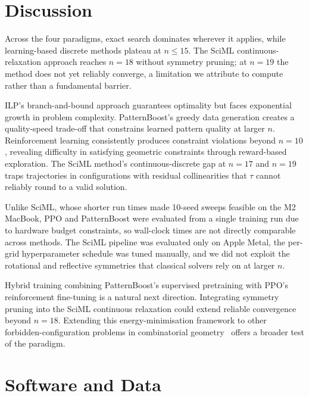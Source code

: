 \documentclass{article}
\theoremstyle{plain}
\theoremstyle{definition}
\theoremstyle{remark}
\begin{document}

\section{Discussion}

Across the four paradigms, exact search dominates wherever it applies, while learning-based discrete methods plateau at $n \le 15$. The SciML continuous-relaxation approach reaches $n = 18$ without symmetry pruning; at $n = 19$ the method does not yet reliably converge, a limitation we attribute to compute rather than a fundamental barrier.

ILP's branch-and-bound approach guarantees optimality but faces exponential growth in problem complexity. PatternBoost's greedy data generation creates a quality-speed trade-off that constrains learned pattern quality at larger $n$. Reinforcement learning consistently produces constraint violations beyond $n = 10$, revealing difficulty in satisfying geometric constraints through reward-based exploration. The SciML method's continuous-discrete gap at $n = 17$ and $n = 19$ traps trajectories in configurations with residual collinearities that $\tau$ cannot reliably round to a valid solution.

Unlike SciML, whose shorter run times made 10-seed sweeps feasible on the M2 MacBook, PPO and PatternBoost were evaluated from a single training run due to hardware budget constraints, so wall-clock times are not directly comparable across methods. The SciML pipeline was evaluated only on Apple Metal, the per-grid hyperparameter schedule was tuned manually, and we did not exploit the rotational and reflective symmetries that classical solvers rely on at larger $n$.

Hybrid training combining PatternBoost's supervised pretraining with PPO's reinforcement fine-tuning is a natural next direction. Integrating symmetry pruning into the SciML continuous relaxation could extend reliable convergence beyond $n = 18$. Extending this energy-minimisation framework to other forbidden-configuration problems in combinatorial geometry~\cite{schuetz2022combinatorial} offers a broader test of the paradigm.


\section*{Software and Data}
\end{document}
